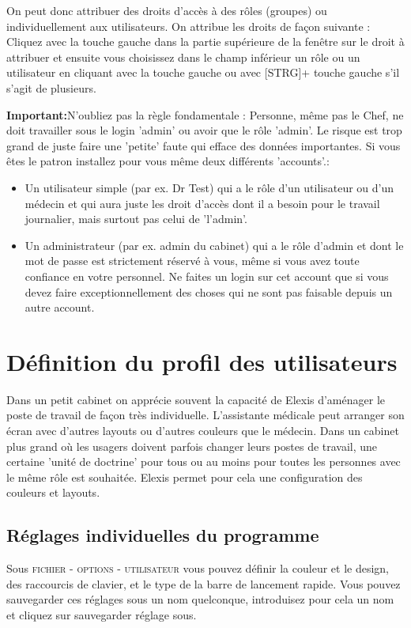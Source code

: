 On peut donc attribuer des droits d'accès à des rôles (groupes) ou individuellement aux utilisateurs. On attribue les droits de façon suivante : Cliquez avec la touche gauche dans la partie supérieure de la fenêtre sur le droit à attribuer et ensuite vous choisissez dans le champ inférieur un rôle ou un utilisateur en cliquant avec la touche gauche ou avec  [STRG]+ touche gauche s'il s'agit de plusieurs.

\textbf{Important:}N'oubliez pas la règle fondamentale : Personne, même pas le Chef, ne doit travailler sous le login 'admin' ou avoir que le rôle 'admin'. Le risque est trop grand de juste faire une 'petite' faute qui efface des données importantes. Si vous êtes le patron installez pour vous même deux différents 'accounts'.:
\begin{itemize}
  \item Un utilisateur simple (par ex. Dr Test) qui a le rôle d'un utilisateur ou d'un médecin et qui aura juste les droit d'accès dont il a besoin pour le travail journalier, mais surtout pas celui de 'l'admin'.
  \item Un administrateur (par ex. admin du cabinet) qui a le rôle d'admin et dont le mot de passe est strictement réservé à vous, même si vous avez toute confiance en votre personnel. Ne faites un login sur cet account que si vous devez faire exceptionnellement des choses qui ne sont pas faisable depuis un autre account.
\end{itemize}

\section{Définition du profil des utilisateurs}
Dans un petit cabinet on apprécie souvent la capacité de Elexis d'aménager le poste de travail de façon très individuelle. L'assistante médicale peut arranger son écran avec d'autres layouts ou d'autres couleurs que le médecin. Dans un cabinet plus grand où les usagers doivent parfois changer leurs postes de travail, une certaine 'unité de doctrine' pour tous ou au moins pour toutes les personnes avec le même rôle est souhaitée. Elexis permet pour cela une configuration des couleurs et layouts.

\subsection{Réglages individuelles du programme}
Sous \textsc{fichier - options - utilisateur} vous pouvez définir la couleur et le design, des raccourcis de clavier, et le type de la barre de lancement rapide. Vous pouvez sauvegarder ces réglages sous un nom quelconque, introduisez pour cela un nom et cliquez sur \glqq sauvegarder réglage sous\grqq{}.

